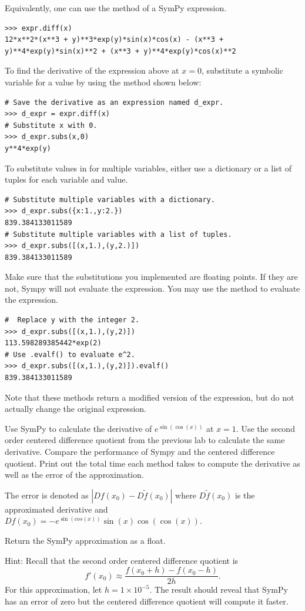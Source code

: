 Equivalently, one can use the   method of a SymPy expression.
\begin{lstlisting}
>>> expr.diff(x)
12*x**2*(x**3 + y)**3*exp(y)*sin(x)*cos(x) - (x**3 + y)**4*exp(y)*sin(x)**2 + (x**3 + y)**4*exp(y)*cos(x)**2
\end{lstlisting}

To find the derivative of the expression above at $x=0$, substitute a symbolic variable for a value by using the  method shown below:
\begin{lstlisting}
# Save the derivative as an expression named d_expr.
>>> d_expr = expr.diff(x)
# Substitute x with 0.
>>> d_expr.subs(x,0)
y**4*exp(y)
\end{lstlisting}

To substitute values in for multiple variables, either use a dictionary or a list of tuples for each variable and value.
\begin{lstlisting}
# Substitute multiple variables with a dictionary.
>>> d_expr.subs({x:1.,y:2.})
839.384133011589
# Substitute multiple variables with a list of tuples.
>>> d_expr.subs([(x,1.),(y,2.)])
839.384133011589
\end{lstlisting}
Make sure that the substitutions you implemented are floating points. If they are not, Sympy will not evaluate the expression. You may use the method  to evaluate the expression.
\begin{lstlisting}
#  Replace y with the integer 2.
>>> d_expr.subs([(x,1.),(y,2)])
113.598289385442*exp(2)
# Use .evalf() to evaluate e^2.
>>> d_expr.subs([(x,1.),(y,2)]).evalf()
839.384133011589
\end{lstlisting}
Note that these methods return a modified version of the expression, but do not actually change the original expression.

\begin{problem}
Use SymPy to calculate the derivative of $e^{\sin\left(\cos\left(x\right)\right)}$ at $x=1$.  Use the second order centered difference quotient from the previous lab to calculate the same derivative. Compare the performance of Sympy and the centered difference quotient. Print out the total time each method takes to compute the derivative as well as the error of the approximation.

The error is denoted as  $|Df(x_0) - D\tilde{f}(x_0)|$ where  $D\tilde{f}(x_0)$ is the approximated derivative and
$Df(x_0) = -e^{\sin\left(cos\left(x\right)\right)}\sin\left(x\right)\cos\left(\cos\left(x\right)\right)$.

Return the SymPy approximation as a float.

Hint: Recall that the second order centered difference quotient is $$f'(x_0)\approx\frac{f(x_0+h)-f(x_0-h)}{2h}.$$ For this approximation, let $h = 1 \times 10^{-5}$.
The result should reveal that SymPy has an error of zero but the centered difference quotient will compute it faster.
\end{problem}

